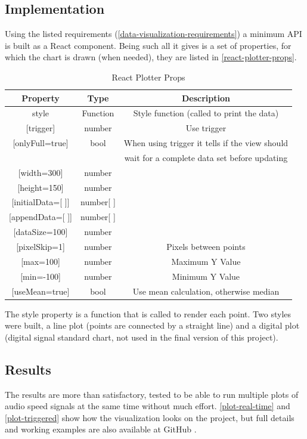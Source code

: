 \subsection{Implementation}
Using the listed requirements (\autoref{data-visualization-requirements}) a minimum
API is built as a React component. Being such all it gives is a set of properties,
for which the chart is drawn (when needed), they are listed in \autoref{react-plotter-props}.
\begin{table}[htb]
  \ABNTEXreducedfont
  \caption[React Plotter Props]{React Plotter Props}
  \label{react-plotter-props}
  \centering
  \begin{tabular}{c|c|c}
    \textbf{Property} & \textbf{Type} & \textbf{Description} \\
    \hline \hline
    style &	Function & Style function (called to print the data) \\
    \hline
    {[trigger]} &	number & Use trigger \\
    \hline
    {[onlyFull=true]}	& bool & When using trigger it tells if the view should \\
                      &      & wait for a complete data set before updating \\
    \hline
    {[width=300]} &	number \\
    \hline
    {[height=150]} & number \\
    \hline
    {[initialData=[ ]]} & number{[ ]} \\
    \hline
    {[appendData=[ ]]} & number{[ ]} \\
    \hline
    {[dataSize=100]} & number \\
    \hline
    {[pixelSkip=1]} &	number &	Pixels between points \\
    \hline
    {[max=100]} &	number & Maximum Y Value \\
    \hline
    {[min=-100]} & number & Minimum Y Value \\
    \hline
    {[useMean=true]} & bool & Use mean calculation, otherwise median  \\
  \end{tabular}
\end{table}
The style property is a function that is called to render each point. Two styles
were built, a line plot (points are connected by a straight line) and a digital
plot (digital signal standard chart, not used in the final version of this project).

\subsection{Results}
The results are more than satisfactory, tested to be able to run multiple plots
of audio speed signals at the same time without much effort. \autoref{plot-real-time}
and \autoref{plot-triggered} show how the visualization looks on the
project, but full details and working examples are also available at GitHub
\cite{react-plotter}.


